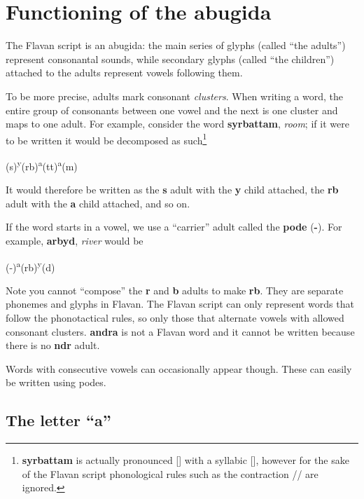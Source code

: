 \documentclass[10pt,oneside]{memoir}
\newcommand{\ipa}[1]{/\textipa{#1}/}
\newcommand{\apa}[1]{[\textipa{#1}]}
\begin{document}
\pagebreak

\section{Functioning of the abugida}

The Flavan script is an abugida: the main series of glyphs (called ``the adults'') represent consonantal sounds, while secondary glyphs (called ``the children'') attached to the adults represent vowels following them.

To be more precise, adults mark consonant \emph{clusters}. When writing a word, the entire group of consonants between one vowel and the next is one cluster and maps to one adult. For example, consider the word \textbf{syrbattam}, \emph{room}; if it were to be written it would be decomposed as such\footnote{\textbf{syrbattam} is actually pronounced \apa{s\s{r}"bat:am} with a syllabic \apa{r}, however for the sake of the Flavan script phonological rules such as the contraction \ipa{1r} \textrightarrow \apa{\s{r}} are ignored.}

\begin{center}
    \Large (s)\textsuperscript{y}(rb)\textsuperscript{a}(tt)\textsuperscript{a}(m)
\end{center}

It would therefore be written as the \textbf{s} adult with the \textbf{y} child attached, the \textbf{rb} adult with the \textbf{a} child attached, and so on.

If the word starts in a vowel, we use a ``carrier'' adult called the \textbf{pode} (\textbf{-}). For example, \textbf{arbyd}, \emph{river} would be

\begin{center}
    \LARGE (-)\textsuperscript{a}(rb)\textsuperscript{y}(d)
\end{center}

Note you cannot ``compose'' the \textbf{r} and \textbf{b} adults to make \textbf{rb}. They are separate phonemes and glyphs in Flavan. The Flavan script can only represent words that follow the phonotactical rules, so only those that alternate vowels with allowed consonant clusters. \textbf{andra} is not a Flavan word and it cannot be written because there is no \textbf{ndr} adult.

Words with consecutive vowels can occasionally appear though. These can easily be written using podes.

\subsection{The letter ``a''}
\end{document}
